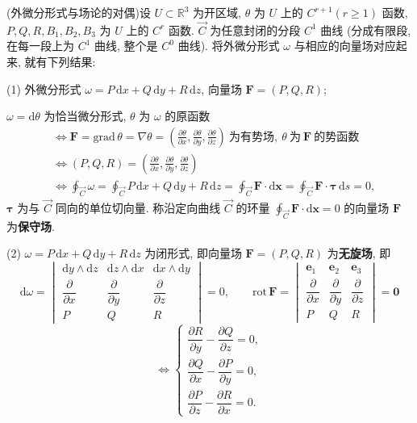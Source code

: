 \begin{definition}\label{def:11.6.5}
(外微分形式与场论的对偶)设 $U\subset\mathbb{R}^{3}$ 为开区域, $\theta$ 为 $U$ 上的 $C^{r+1}(r\geqslant1)$ 函数, $P,Q,R,B_{1},B_{2},B_{3}$ 为 $U$ 上的 $C^{r}$ 函数. $\overrightarrow{C}$ 为任意封闭的分段 $C^{1}$ 曲线 (分成有限段, 在每一段上为 $C^{1}$ 曲线, 整个是 $C^{0}$ 曲线). 将外微分形式 $\omega$ 与相应的向量场对应起来, 就有下列结果:

(1) 外微分形式 $\omega=P\,\mathrm{d}x+Q\,\mathrm{d}y+R\,\mathrm{d}z$, 向量场 $\boldsymbol{F}=(P,Q,R)$;

$\omega=\mathrm{d}\theta$ 为恰当微分形式, $\theta$ 为 $\omega$ 的原函数
\[
\begin{aligned}
&\Longleftrightarrow\boldsymbol{F}=\mathrm{grad}\,\theta=\nabla\theta=\left(\frac{\partial\theta}{\partial x},\frac{\partial\theta}{\partial y},\frac{\partial\theta}{\partial z}\right)\ \text{为有势场},\ \theta\ \text{为}\ \boldsymbol{F}\ \text{的势函数}\\
&\Longleftrightarrow(P,Q,R)=\left(\frac{\partial\theta}{\partial x},\frac{\partial\theta}{\partial y},\frac{\partial\theta}{\partial z}\right)\\
&\Longleftrightarrow\oint_{\overrightarrow{C}}\omega=\oint_{\overrightarrow{C}}P\,\mathrm{d}x+Q\,\mathrm{d}y+R\,\mathrm{d}z=\oint_{\overrightarrow{C}}\boldsymbol{F}\cdot\mathrm{d}\boldsymbol{x}=\oint_{\overrightarrow{C}}\boldsymbol{F}\cdot\boldsymbol{\tau}\,\mathrm{d}s=0,
\end{aligned}
\]
$\boldsymbol{\tau}$ 为与 $\overrightarrow{C}$ 同向的单位切向量. 称沿定向曲线 $\overrightarrow{C}$ 的环量 $\oint_{\overrightarrow{C}}\boldsymbol{F}\cdot\mathrm{d}\boldsymbol{x}=0$ 的向量场 $\boldsymbol{F}$ 为\textbf{保守场}.

(2) $\omega=P\,\mathrm{d}x+Q\,\mathrm{d}y+R\,\mathrm{d}z$ 为闭形式, 即向量场 $\boldsymbol{F}=(P,Q,R)$ 为\textbf{无旋场}, 即
\[
\mathrm{d}\omega=\begin{vmatrix}\mathrm{d}y\wedge\mathrm{d}z&\mathrm{d}z\wedge\mathrm{d}x&\mathrm{d}x\wedge\mathrm{d}y\\ \dfrac{\partial}{\partial x}&\dfrac{\partial}{\partial y}&\dfrac{\partial}{\partial z}\\ P&Q&R\end{vmatrix}=0,\qquad
\mathrm{rot}\,\boldsymbol{F}=\begin{vmatrix}\boldsymbol{e}_{1}&\boldsymbol{e}_{2}&\boldsymbol{e}_{3}\\ \dfrac{\partial}{\partial x}&\dfrac{\partial}{\partial y}&\dfrac{\partial}{\partial z}\\ P&Q&R\end{vmatrix}=\boldsymbol{0}
\]
\[
\Longleftrightarrow\begin{cases}
\dfrac{\partial R}{\partial y}-\dfrac{\partial Q}{\partial z}=0,\\[4pt]
\dfrac{\partial Q}{\partial x}-\dfrac{\partial P}{\partial y}=0,\\[4pt]
\dfrac{\partial P}{\partial z}-\dfrac{\partial R}{\partial x}=0.
\end{cases}
\]


\end{definition}
